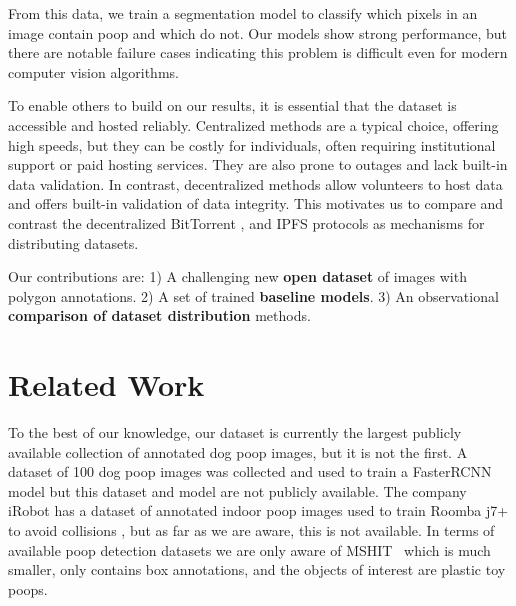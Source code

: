 \documentclass[10pt,twocolumn,letterpaper]{article}
\begin{document}
From this data, we train a segmentation model to classify which pixels in an image contain poop and which do
  not.
Our models show strong performance, but there are notable failure cases indicating this problem is difficult
  even for modern computer vision algorithms.

To enable others to build on our results, it is essential that the dataset is accessible and hosted
  reliably.
Centralized methods are a typical choice, offering high speeds, but they can be costly for individuals,
  often requiring institutional support or paid hosting services.
They are also prone to outages and lack built-in data validation.
In contrast, decentralized methods allow volunteers to host data and offers built-in validation of data
  integrity.
This motivates us to compare and contrast the decentralized BitTorrent \cite{cohen_incentives_2003}, and
  IPFS \cite{benet_ipfs_2014} protocols as mechanisms for distributing datasets.


Our contributions are:
1) A challenging new \textbf{open dataset} of images with polygon annotations.
2) A set of trained \textbf{baseline models}.
3) An observational \textbf{comparison of dataset distribution} methods.



\section{Related Work}
\label{sec:relatedwork}

To the best of our knowledge, our dataset is currently the largest publicly available collection of
  annotated dog poop images, but it is not the first.
A dataset of 100 dog poop images was collected and used to train a FasterRCNN model
  \cite{neeraj_madan_dog_2019} but this dataset and model are not publicly available.
The company iRobot has a dataset of annotated indoor poop images used to train Roomba j7+ to avoid
  collisions \cite{roomba_2021}, but as far as we are aware, this is not available.
In terms of available poop detection datasets we are only aware of MSHIT~\cite{mshit_2020} which is much
  smaller, only contains box annotations, and the objects of interest are plastic toy poops.
\end{document}
